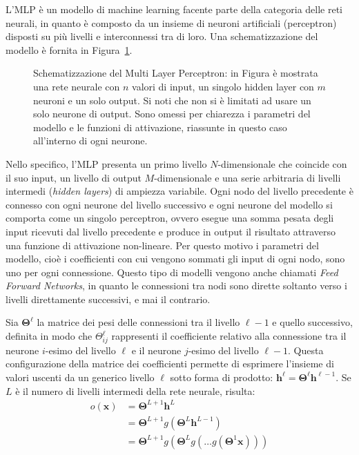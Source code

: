 L'MLP è un modello di machine learning facente parte della categoria delle reti
neurali, in quanto è composto da un insieme di neuroni artificiali (perceptron)
disposti su più livelli e interconnessi tra di loro. Una schematizzazione del
modello è fornita in Figura~\ref{fig:mlp}.
\begin{figure}[htp]
  \caption{Schematizzazione del Multi Layer Perceptron: in Figura è mostrata
    una rete neurale con $n$ valori di input, un singolo hidden layer con $m$
    neuroni e un solo output. Si noti che non si è limitati ad usare un solo
    neurone di output. Sono omessi per chiarezza i parametri del modello e le
    funzioni di attivazione, riassunte in questo caso all'interno di ogni
    neurone.%
  }%
  \label{fig:mlp}
\end{figure}
Nello specifico, l'MLP presenta un primo livello $N$-dimensionale che coincide con il
suo input, un livello di output $M$-dimensionale e una serie arbitraria di
livelli intermedi (\emph{hidden layers}) di ampiezza variabile. Ogni nodo del
livello precedente è connesso con ogni neurone del livello successivo e ogni
neurone del modello si comporta come un singolo perceptron, ovvero esegue una
somma pesata degli input ricevuti dal livello precedente e produce in output il
risultato attraverso una funzione di attivazione non-lineare. Per questo motivo
i parametri del modello, cioè i coefficienti con cui vengono sommati gli input
di ogni nodo, sono uno per ogni connessione. Questo tipo di modelli vengono
anche chiamati \emph{Feed Forward Networks}, in quanto le connessioni tra nodi
sono dirette soltanto verso i livelli direttamente successivi, e mai il
contrario.

Sia $\bm \Theta^\ell$ la matrice dei pesi delle connessioni tra il livello
$\ell-1$ e quello successivo, definita in modo che $ \Theta^\ell_{ij} $
rappresenti il coefficiente relativo alla connessione tra il neurone $i$-esimo
del livello $\ell$ e il neurone $j$-esimo del livello $\ell-1$. Questa
configurazione della matrice dei coefficienti permette di esprimere l'insieme
di valori uscenti da un generico livello $\ell$ sotto forma di prodotto: $ \bm
h^\ell = \bm \Theta^\ell \bm h^{\ell-1}$. Se $L$ è il numero di livelli
intermedi della rete neurale, risulta:
\begin{align*}
  o(\bm x) &= \bm \Theta^{L+1} \bm h^L \\
  &= \bm \Theta^{L+1} g( \bm \Theta^L \bm h^{L-1}) \\
  &= \bm \Theta^{L+1} g(\bm \Theta^L g(\dots g(\bm \Theta^1 \bm x)))
\end{align*}
